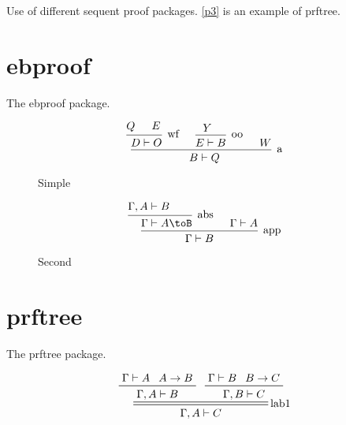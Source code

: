 \documentclass[class=article, crop=false]{standalone}
\title{\titlelink{Sequent Examples}{}}
\author{John Grey}
\date{May 11, 2022}
\begin{document}


Use of different sequent proof packages. \ref{p3} is an example of prftree.

\pagebreak
\section{ebproof}

The ebproof package.

\begin{figure} \[
    \begin{prooftree}
      \hypo{Q} \hypo{E}
      \infer2[wf]{D &\vdash O}
      \hypo{Y}
      \infer1[oo]{E &\vdash B}
      \hypo{W}
      \infer3[a]{B &\vdash Q}
    \end{prooftree}
  \] \centering \caption{Simple} \label{eq:eb1}
\end{figure}

\begin{figure}
  \[
  \begin{prooftree}
    \hypo{ \Gamma, A &\vdash B }
    \infer1[abs]{ \Gamma &\vdash A\toB }
    \hypo{ \Gamma \vdash A }
    \infer2[app]{ \Gamma \vdash B }
  \end{prooftree}
  \] 
  \centering \caption{Second} \label{eq:eb2}
\end{figure}


\pagebreak
\section{prftree}

The prftree package.

\begin{figure*}[h]
  \[
    \prftree[r,double,straight]{lab1} 
    {\prftree{\Gamma \vdash A}{A \rightarrow B}
      {\Gamma, A \vdash B}}
    {\prftree{\Gamma \vdash B}{B \rightarrow C}
      {\Gamma, B \vdash C}}
    {\Gamma, A \vdash C} 
  \]
  \caption{Proof 3}
  \label{p3}
\end{figure*}




\IfStandalone{
  \nocite{*}
  
  
  }{}
\end{document}
